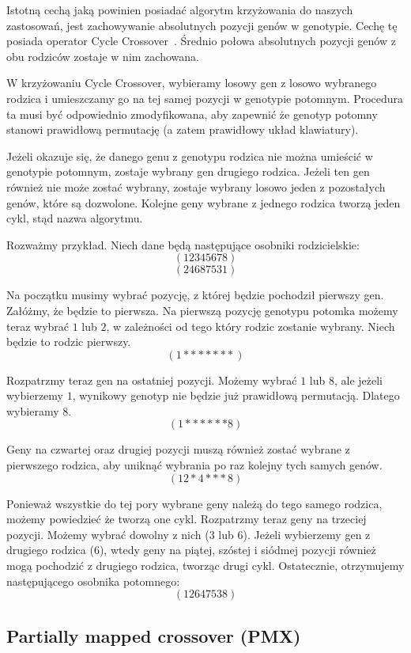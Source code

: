 \documentclass[brudnopis]{xmgr}
\begin{document}
Istotną cechą jaką powinien posiadać algorytm krzyżowania do naszych zastosowań, jest zachowywanie absolutnych pozycji genów w genotypie. Cechę tę posiada operator Cycle Crossover~\cite{Operators:2000:TSP}. Średnio połowa absolutnych pozycji genów z obu rodziców zostaje w nim zachowana.

W krzyżowaniu Cycle Crossover, wybieramy losowy gen z losowo wybranego rodzica i umieszczamy go na tej samej pozycji w genotypie potomnym. Procedura ta musi być odpowiednio zmodyfikowana, aby zapewnić że genotyp potomny stanowi prawidłową permutację (a zatem prawidłowy układ klawiatury).

Jeżeli okazuje się, że danego genu z genotypu rodzica nie można umieścić w genotypie potomnym, zostaje wybrany gen drugiego rodzica. Jeżeli ten gen również nie może zostać wybrany, zostaje wybrany losowo jeden z pozostałych genów, które są dozwolone. Kolejne geny wybrane z jednego rodzica tworzą jeden cykl, stąd nazwa algorytmu.

Rozważmy przykład. Niech dane będą następujące osobniki rodzicielskie:
$$ (1 2 3 4 5 6 7 8) $$
$$ (2 4 6 8 7 5 3 1) $$

Na początku musimy wybrać pozycję, z której będzie pochodził pierwszy gen. Załóżmy, że będzie to pierwsza. Na pierwszą pozycję genotypu potomka możemy teraz wybrać $1$ lub $2$, w zależności od tego który rodzic zostanie wybrany. Niech będzie to rodzic pierwszy.
$$ (1 * * * * * * *) $$

Rozpatrzmy teraz gen na ostatniej pozycji. Możemy wybrać $1$ lub $8$, ale jeżeli wybierzemy $1$, wynikowy genotyp nie będzie już prawidłową permutacją. Dlatego wybieramy $8$.
$$ (1 * * * * * * 8) $$

Geny na czwartej oraz drugiej pozycji muszą również zostać wybrane z pierwszego rodzica, aby uniknąć wybrania po raz kolejny tych samych genów.
$$ (1 2 * 4 * * * 8) $$

Ponieważ wszystkie do tej pory wybrane geny należą do tego samego rodzica, możemy powiedzieć że tworzą one cykl. Rozpatrzmy teraz geny na trzeciej pozycji. Możemy wybrać dowolny z nich ($3$ lub $6$). Jeżeli wybierzemy gen z drugiego rodzica ($6$), wtedy geny na piątej, szóstej i siódmej pozycji również mogą pochodzić z drugiego rodzica, tworząc drugi cykl. Ostatecznie, otrzymujemy następującego osobnika potomnego:
$$ (1 2 6 4 7 5 3 8) $$


\subsection{Partially mapped crossover (PMX)}
\end{document}
